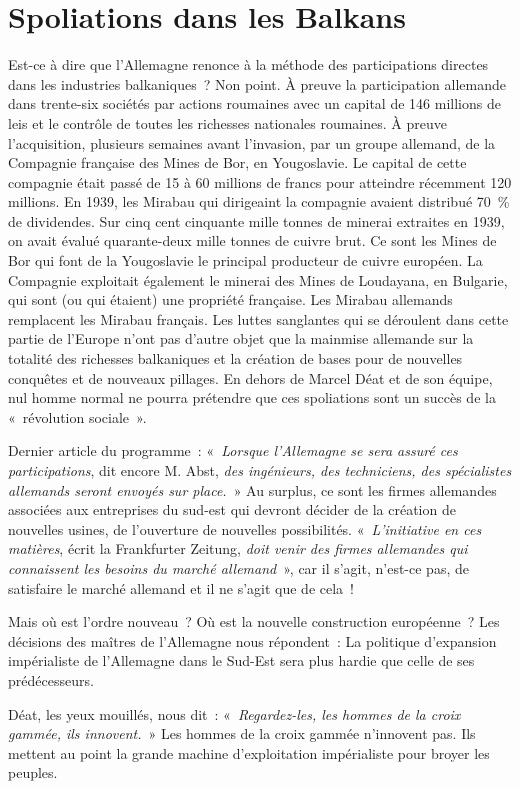\documentclass[french,twoside]{book} %
\begin{document}
\section[{Spoliations dans les Balkans}]{Spoliations dans les Balkans}
\noindent Est-ce à dire que l’Allemagne renonce à la méthode des participations directes dans les industries balkaniques ? Non point. À preuve la participation allemande dans trente-six sociétés par actions roumaines avec un capital de 146 millions de leis et le contrôle de toutes les richesses nationales roumaines. À preuve l’acquisition, plusieurs semaines avant l’invasion, par un groupe allemand, de la Compagnie française des Mines de Bor, en Yougoslavie. Le capital de cette compagnie était passé de 15 à 60 millions de francs pour atteindre récemment 120 millions. En 1939, les Mirabau qui dirigeaint la compagnie avaient distribué 70 \% de dividendes. Sur cinq cent cinquante mille tonnes de minerai extraites en 1939, on avait évalué quarante-deux mille tonnes de cuivre brut. Ce sont les Mines de Bor qui font de la Yougoslavie le principal producteur de cuivre européen. La Compagnie exploitait également le minerai des Mines de Loudayana, en Bulgarie, qui sont (ou qui étaient) une propriété française. Les Mirabau allemands remplacent les Mirabau français. Les luttes sanglantes qui se déroulent dans cette partie de l’Europe n’ont pas d’autre objet que la mainmise allemande sur la totalité des richesses balkaniques et la création de bases pour de nouvelles conquêtes et de nouveaux pillages. En dehors de Marcel Déat et de son équipe, nul homme normal ne pourra prétendre que ces spoliations sont un succès de la « révolution sociale ».\par
Dernier article du programme : «\emph{ Lorsque l’Allemagne se sera assuré ces participations}, dit encore M. Abst, \emph{des ingénieurs, des techniciens, des spécialistes allemands seront envoyés sur place.} » Au surplus, ce sont les firmes allemandes associées aux entreprises du sud-est qui devront décider de la création de nouvelles usines, de l’ouverture de nouvelles possibilités. « \emph{L’initiative en ces matières}, écrit la Frankfurter Zeitung, \emph{doit venir des firmes allemandes qui connaissent les besoins du marché allemand} », car il s’agit, n’est-ce pas, de satisfaire le marché allemand et il ne s’agit que de cela !\par
Mais où est l’ordre nouveau ? Où est la nouvelle construction européenne ? Les décisions des maîtres de l’Allemagne nous répondent : La politique d’expansion impérialiste de l’Allemagne dans le Sud-Est sera plus hardie que celle de ses prédécesseurs.\par
Déat, les yeux mouillés, nous dit : « \emph{Regardez-les, les hommes de la croix gammée, ils innovent.} » Les hommes de la croix gammée n’innovent pas. Ils mettent au point la grande machine d’exploitation impérialiste pour broyer les peuples.
\end{document}
